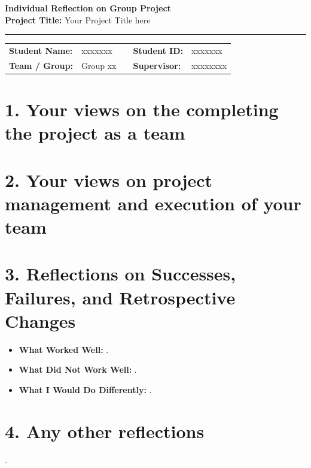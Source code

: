 \documentclass[11pt, a4paper]{article}
\begin{document}
\begin{center}
    {\Large \bfseries Individual Reflection on Group Project} \\[0.3em]
    {\small \textbf{Project Title:} Your Project Title here} \\[0.2em]
    \rule{\textwidth}{1pt}
\end{center}

\vspace{-0.5em}
\noindent
\begin{tabular}{@{}ll p{0.5em} ll@{}}
    \textbf{Student Name:} & xxxxxxx & & \textbf{Student ID:} & xxxxxxx \\
    \textbf{Team / Group:} & Group xx & & \textbf{Supervisor:} & xxxxxxxx \\
\end{tabular}

\vspace{0.2em}

\section*{1. Your views on the completing the project as a team}
\lipsum[1][1-7]

\section*{2. Your views on project management and execution of your team}
\lipsum[2][1-8]

\section*{3. Reflections on Successes, Failures, and Retrospective Changes}
\begin{itemize}
    \item \textbf{What Worked Well:} \lipsum[3][1-5].
    \item \textbf{What Did Not Work Well:} \lipsum[4][1-6].
    \item \textbf{What I Would Do Differently:} \lipsum[5][1-6].
\end{itemize}

\section*{4. Any other reflections}
\lipsum[6][1-6].
\end{document}
